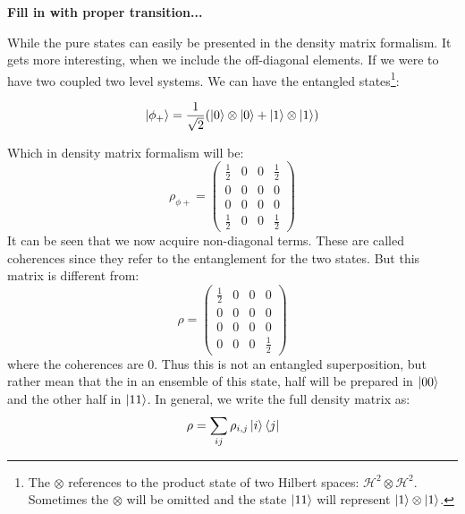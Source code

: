 \textbf{Fill in with proper transition...}

While the pure states can easily be presented in the density matrix formalism. It gets more interesting, when we include the off-diagonal elements. If we were to have two coupled two level systems. We can have the entangled states\footnote{The $\otimes$ references to the product state of two Hilbert spaces: $\mathcal{H}^2 \otimes \mathcal{H}^2$. Sometimes the $\otimes$ will be omitted and the state $\ket{1 1}$ will represent $\ket{1} \otimes \ket{1}$.}:

\begin{equation}
    \ket{\phi_+} = \frac{1}{\sqrt{2}}(\ket{0}\otimes \ket{0} + \ket{1}\otimes\ket{1})
\end{equation}

Which in density matrix formalism will be:
\begin{equation}
    \rho_{\phi+} = 
    \begin{pmatrix}
        \frac{1}{2} & 0 & 0 & \frac{1}{2} \\
        0 & 0 & 0 & 0 \\
        0 & 0 & 0 & 0 \\
        \frac{1}{2} & 0 & 0 & \frac{1}{2}
    \end{pmatrix}
\end{equation}
It can be seen that we now acquire non-diagonal terms. These are called coherences since they refer to the entanglement for the two states.  But this matrix is different from: 
\begin{equation}
    \rho = 
    \begin{pmatrix}
        \frac{1}{2} & 0 & 0 & 0 \\
        0 & 0 & 0 & 0 \\
        0 & 0 & 0 & 0 \\
        0 & 0 & 0 & \frac{1}{2}
    \end{pmatrix}
\end{equation}
where the coherences are 0. Thus this is not an entangled superposition, but rather mean that the in an ensemble of this state, half will be prepared in $\ket{00}$ and the other half in $\ket{11}$. 
In general, we write the full density matrix as:
\begin{equation}
    \rho = \sum_{ij} \rho_{i,j} \ket{i}\bra{j}
\end{equation}

